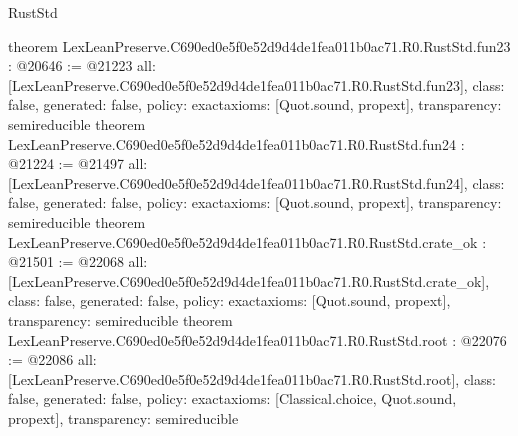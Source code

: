 \begin{lexlean}{RustStd}
\begin{coremodule}
{}
theorem LexLeanPreserve.C690ed0e5f0e52d9d4de1fea011b0ac71.R0.RustStd.fun23 : @20646 := @21223 {
  all: [LexLeanPreserve.C690ed0e5f0e52d9d4de1fea011b0ac71.R0.RustStd.fun23],
  class: false,
  generated: false,
  policy: exact{axioms: [Quot.sound, propext]},
  transparency: semireducible
}
theorem LexLeanPreserve.C690ed0e5f0e52d9d4de1fea011b0ac71.R0.RustStd.fun24 : @21224 := @21497 {
  all: [LexLeanPreserve.C690ed0e5f0e52d9d4de1fea011b0ac71.R0.RustStd.fun24],
  class: false,
  generated: false,
  policy: exact{axioms: [Quot.sound, propext]},
  transparency: semireducible
}
theorem LexLeanPreserve.C690ed0e5f0e52d9d4de1fea011b0ac71.R0.RustStd.crate_ok : @21501 := @22068 {
  all: [LexLeanPreserve.C690ed0e5f0e52d9d4de1fea011b0ac71.R0.RustStd.crate_ok],
  class: false,
  generated: false,
  policy: exact{axioms: [Quot.sound, propext]},
  transparency: semireducible
}
theorem LexLeanPreserve.C690ed0e5f0e52d9d4de1fea011b0ac71.R0.RustStd.root : @22076 := @22086 {
  all: [LexLeanPreserve.C690ed0e5f0e52d9d4de1fea011b0ac71.R0.RustStd.root],
  class: false,
  generated: false,
  policy: exact{axioms: [Classical.choice, Quot.sound, propext]},
  transparency: semireducible
}


\end{coremodule}
\end{lexlean}
